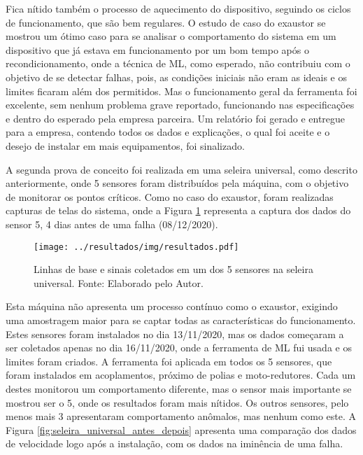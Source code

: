 \documentclass[a4paper]{ifacconf}
\begin{document}
Fica nítido também o processo de aquecimento do dispositivo, seguindo os ciclos de funcionamento, que são bem regulares. O estudo de caso do 
exaustor se mostrou um ótimo caso para se analisar o comportamento do sistema em um dispositivo que já estava em funcionamento por um bom tempo 
após o recondicionamento, onde a técnica de ML, como esperado, não contribuiu com o objetivo de se detectar falhas, pois, as
condições iniciais não eram as ideais e os limites ficaram além dos permitidos. Mas o funcionamento geral da ferramenta foi excelente, sem nenhum
problema grave reportado, funcionando nas especificações e dentro do esperado pela empresa parceira. Um relatório foi gerado e entregue
para a empresa, contendo todos os dados e explicações, o qual foi aceite e o desejo de instalar em mais equipamentos, foi sinalizado.

A segunda prova de conceito foi realizada em uma seleira universal, como descrito anteriormente, onde 5 sensores foram distribuídos pela máquina, com o 
objetivo de monitorar os pontos críticos. Como no caso do exaustor, foram realizadas capturas de telas do sistema, onde a Figura
\ref{fig:seleira_universal} representa a captura dos dados do sensor 5, 4 dias antes de uma falha (08/12/2020). 

\begin{figure}[h!]
  \begin{center}
      \texttt{[image: ../resultados/img/resultados.pdf]}
  \end{center}
  \caption{Linhas de base e sinais coletados em um dos 5 sensores na seleira universal. Fonte: Elaborado pelo Autor.}
  \label{fig:seleira_universal}
\end{figure}

Esta máquina não apresenta um processo contínuo como o exaustor, exigindo uma amostragem maior para se captar todas as características do 
funcionamento. Estes sensores foram instalados no dia 13/11/2020, mas os dados começaram a ser coletados apenas no dia 16/11/2020, onde a 
ferramenta de ML fui usada e os limites foram criados. 
A ferramenta foi aplicada em todos os 5 sensores, que foram instalados em acoplamentos, próximo de polias e moto-redutores.
Cada um destes monitorou um comportamento diferente, mas o sensor mais importante se mostrou ser o 5, onde os resultados foram mais nítidos. 
Os outros sensores, pelo menos mais 3 apresentaram comportamento anômalos, mas nenhum como este. A Figura \ref{fig:seleira_universal_antes_depois}
apresenta uma comparação dos dados de velocidade logo após a instalação, com os dados na iminência de uma falha.
\end{document}
